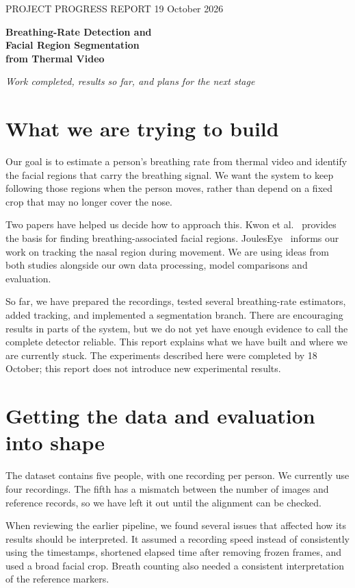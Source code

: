 \documentclass[11pt,a4paper]{article}
\begin{document}
{\small\color{accent} PROJECT PROGRESS REPORT \hfill 19 October 2026}

\vspace{8mm}
{\LARGE\bfseries\color{ink} Breathing-Rate Detection and\\[3pt] Facial Region Segmentation\\[3pt] from Thermal Video}

\vspace{4mm}
\textit{Work completed, results so far, and plans for the next stage}

\section{What we are trying to build}
Our goal is to estimate a person's breathing rate from thermal video and identify the facial regions that carry the breathing signal. We want the system to keep following those regions when the person moves, rather than depend on a fixed crop that may no longer cover the nose.

Two papers have helped us decide how to approach this. Kwon et al.~\cite{kwon} provides the basis for finding breathing-associated facial regions. JoulesEye~\cite{jouleseye} informs our work on tracking the nasal region during movement. We are using ideas from both studies alongside our own data processing, model comparisons and evaluation.

So far, we have prepared the recordings, tested several breathing-rate estimators, added tracking, and implemented a segmentation branch. There are encouraging results in parts of the system, but we do not yet have enough evidence to call the complete detector reliable. This report explains what we have built and where we are currently stuck. The experiments described here were completed by 18 October; this report does not introduce new experimental results.

\section{Getting the data and evaluation into shape}
The dataset contains five people, with one recording per person. We currently use four recordings. The fifth has a mismatch between the number of images and reference records, so we have left it out until the alignment can be checked.

When reviewing the earlier pipeline, we found several issues that affected how its results should be interpreted. It assumed a recording speed instead of consistently using the timestamps, shortened elapsed time after removing frozen frames, and used a broad facial crop. Breath counting also needed a consistent interpretation of the reference markers.
\end{document}
